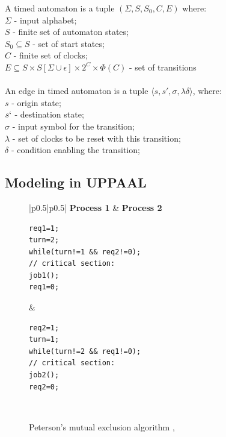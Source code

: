 \newpage
\begin{definition}
A timed automaton is a tuple $(\Sigma, S, S_0, C, E)$ where:\\
$\Sigma$ - input alphabet;\\
$S$ - finite set of automaton states;\\
$S_0 \subseteq S$ - set of start states; \\
$C$ - finite set of clocks; \\
$E \subseteq S \times S [\Sigma \cup {\epsilon}] \times 2^C \times \Phi(C)$ - set of transitions\\\\
An edge in timed automaton is a tuple $\langle s, s', \sigma, \lambda \delta \rangle$, where:\\
$s$ - origin state;\\
$s`$ - destination state;\\
$\sigma$ - input symbol for the transition;\\
$\lambda$ - set of clocks to be reset with this transition;\\
$\delta$ - condition enabling the transition;\\
\label{def:automaton}
\end{definition}


\subsection{Modeling in UPPAAL}


\begin{figure}[H]
\caption{Peterson’s mutual exclusion algorithm 
\label{fig:mutex_code}
\cite{SmallTutorial2009}, \cite{Peterson1981}}
\begin{tabular}{|p{}|p{}|}
\hline
\textbf{Process 1} & \textbf{Process 2} \\
\hline
\begin{lstlisting}[basicstyle=\ttfamily]
req1=1;
turn=2;
while(turn!=1 && req2!=0);
// critical section:
job1();
req1=0;
\end{lstlisting}
&
\begin{lstlisting}[basicstyle=\ttfamily]
req2=1;
turn=1;
while(turn!=2 && req1!=0);
// critical section:
job2();
req2=0;
\end{lstlisting}
\\
\hline
\end{tabular}
\end{figure}


